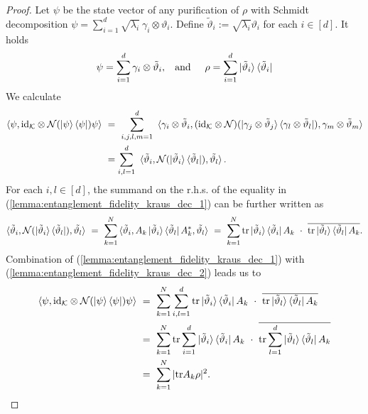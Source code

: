  \begin{proof}
   Let $\psi$ be the state vector of any purification of $\rho$ with Schmidt decomposition
$
    \psi = \sum_{i=1}^d \sqrt{\lambda_i} \ \gamma_i \otimes \vartheta_i.
 $
   Define $\tilde{\vartheta}_i := \sqrt{\lambda_i} \vartheta_i$ for each $i \in [d]$.  It holds
   \begin{align}
    \psi = \sum_{i=1}^d \gamma_i \otimes \tilde{\vartheta}_i, \hspace{.3cm} \text{and} \hspace{.5cm} \rho = \sum_{i=1}^d \ket{\tilde{\vartheta}_i} \bra{\tilde{\vartheta}_i} 
   \end{align}
  We calculate 
  \begin{align}
   \braket{\psi, \id_{\cK} \otimes \cN(\ket{\psi}\bra{\psi}) \psi} \ 
   & = \ \sum_{i,j,l,m =1}^d \ \braket{\gamma_i \otimes \tilde{\vartheta}_i, 
    (\id_{\cK} \otimes \cN)(\ket{\gamma_j \otimes \tilde{\vartheta}_j}\bra{\gamma_l \otimes \tilde{\vartheta}_l}), \gamma_m \otimes \tilde{\vartheta}_m} \nonumber \\
   & = \sum_{i,l = 1}^d \ \braket{\tilde{\vartheta}_i, \cN(\ket{\tilde{\vartheta}_i}\bra{\tilde{\vartheta}_l}), \tilde{\vartheta_l}}. \label{lemma:entanglement_fidelity_kraus_dec_1}
  \end{align}
  For each $i,l \in [d]$, the summand on the r.h.s. of the equality in (\ref{lemma:entanglement_fidelity_kraus_dec_1}) can be further written as
  \begin{align}
   \braket{\tilde{\vartheta}_i, {\mathcal N}(\ket{\tilde{\vartheta}_i}\bra{\tilde{\vartheta}_l}), \tilde{\vartheta_l}} \
     = \ \sum_{k=1}^N  \braket{\tilde{\vartheta}_i, A_k\ket{\tilde{\vartheta}_i}\bra{\tilde{\vartheta}_l}A_k^{\ast}, \tilde{\vartheta_l}} \nonumber 
    \ = \ \sum_{k=1}^N \mathrm{tr} \ket{\tilde{\vartheta}_i}\bra{\tilde{\vartheta}_i}A_k  \ \cdot \  \overline{\mathrm{tr} \ket{\tilde{\vartheta}_l}\bra{\tilde{\vartheta}_l}A_k}.  \label{lemma:entanglement_fidelity_kraus_dec_2}
  \end{align}
  Combination of (\ref{lemma:entanglement_fidelity_kraus_dec_1}) with (\ref{lemma:entanglement_fidelity_kraus_dec_2}) leads us to
  \begin{align*}
   \braket{\psi, \id_{\cK} \otimes \cN(\ket{\psi}\bra{\psi}) \psi} \ 
   & = \ \sum_{k=1}^N \sum_{i,l=1}^d \tr \ket{\tilde{\vartheta}_i}\bra{\tilde{\vartheta}_i}A_k  \ \cdot \  \overline{\tr \ket{\tilde{\vartheta}_l}\bra{\tilde{\vartheta}_l}A_k} \\
   & = \ \sum_{k=1}^N \tr \sum_{i=1}^d \ket{\tilde{\vartheta}_i}\bra{\tilde{\vartheta}_i}A_k  \ \cdot \  \overline{\tr \sum_{l=1}^d \ket{\tilde{\vartheta}_l}\bra{\tilde{\vartheta}_l}A_k} \\
   & = \ \sum_{k=1}^N |\tr A_k \rho |^2.
  \end{align*}
 \end{proof}
